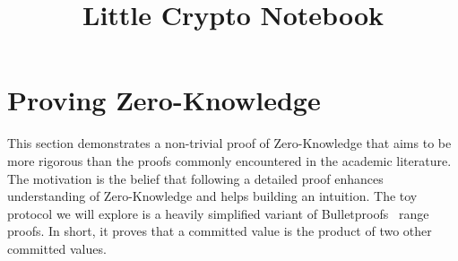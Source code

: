 \documentclass{article}
\title{Little Crypto Notebook}
\begin{document}
\maketitle
\tableofcontents




\section{Proving Zero-Knowledge}
This section demonstrates a non-trivial proof of Zero-Knowledge that aims to be more rigorous than the proofs commonly encountered in the academic literature.
The motivation is the belief that following a detailed proof enhances understanding of Zero-Knowledge and helps building an intuition.
The toy protocol we will explore is a heavily simplified variant of Bulletproofs~\cite{bp1} range proofs.
In short, it proves that a committed value is the product of two other committed values.



\printbibliography
\end{document}
